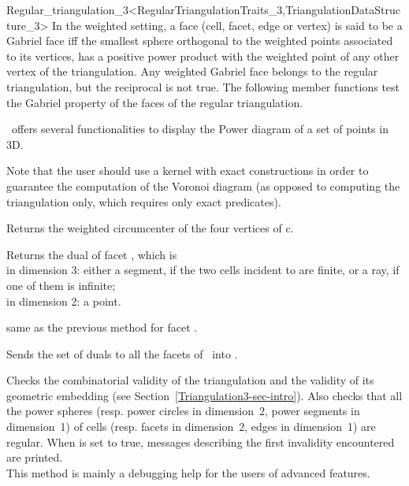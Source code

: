 \begin{ccRefClass}{Regular_triangulation_3<RegularTriangulationTraits_3,TriangulationDataStructure_3>}
In the weighted setting, a face (cell, facet, edge or vertex) 
is said to be a Gabriel face iff
the  smallest sphere  orthogonal to the weighted 
points associated to its vertices,
has a positive power product with the weighted point
of any other vertex of the triangulation.
Any weighted Gabriel face belongs to the
regular triangulation, but the reciprocal is not true.
The following member functions test the Gabriel property of the
faces of the regular triangulation.
\ccGlue 
{}
\ccGlue 
{}
\ccGlue
{} {}
\ccGlue
{}


\cgal\ offers several functionalities to display the Power diagram of 
a set of points in 3D.

Note that the user should use a kernel with exact constructions in order
to guarantee the computation of the Voronoi diagram (as opposed to computing
the triangulation only, which requires only exact predicates).

{Returns the weighted circumcenter of the four vertices of c.
}

{Returns the dual of facet , which is \\
in dimension 3: either a segment, if the two cells incident to   
are finite, or a ray, if one of them is infinite;\\
in dimension 2: a point.
}

{same as the previous method for facet .}

{Sends the set of duals to all the facets of \ccVar\ into .}


\begin{ccAdvanced}
{Checks the combinatorial validity of the triangulation and the
validity of its geometric embedding (see
Section~\ref{Triangulation3-sec-intro}). Also checks that all the
power spheres (resp. power circles in dimension~2, power segments in
dimension~1) of cells (resp. facets in dimension~2, edges in
dimension~1) are regular. When 
is set to true, messages describing the first invalidity encountered
are printed.\\ This method is mainly a debugging help for the users of
advanced features.
}


\end{ccAdvanced}
\end{ccRefClass}

